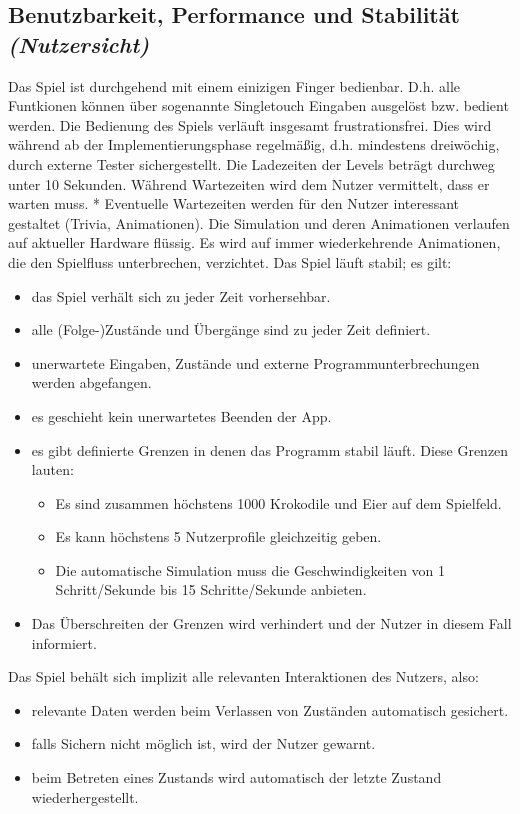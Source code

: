 \subsection{Benutzbarkeit, Performance und Stabilität \textit{(Nutzersicht)}}
\begin{requirements}
	 Das Spiel ist durchgehend mit einem einizigen Finger bedienbar. D.h. alle Funtkionen können über sogenannte Singletouch Eingaben ausgelöst bzw. bedient werden.
	 Die Bedienung des Spiels verläuft insgesamt frustrationsfrei. Dies wird während ab der Implementierungsphase regelmäßig, d.h. mindestens dreiwöchig, durch externe Tester sichergestellt.
	 Die Ladezeiten der Levels beträgt durchweg unter 10 Sekunden.
	 Während Wartezeiten wird dem Nutzer vermittelt, dass er warten muss.
	 Eventuelle Wartezeiten werden für den Nutzer interessant gestaltet (Trivia, Animationen).
	 Die Simulation und deren Animationen verlaufen auf aktueller Hardware flüssig.
	 Es wird auf immer wiederkehrende Animationen, die den Spielfluss unterbrechen, verzichtet.
	 Das Spiel läuft stabil; es gilt:
		\begin{itemize}
			\item das Spiel verhält sich zu jeder Zeit vorhersehbar.
			\item alle (Folge-)Zustände und Übergänge sind zu jeder Zeit definiert.
			\item unerwartete Eingaben, Zustände und externe Programmunterbrechungen werden abgefangen.
			\item es geschieht kein unerwartetes Beenden der App.
			\item es gibt definierte Grenzen in denen das Programm stabil läuft. Diese Grenzen lauten:
				\begin{itemize}
					\item Es sind zusammen höchstens 1000 Krokodile und Eier auf dem Spielfeld.
					\item Es kann höchstens 5 Nutzerprofile gleichzeitig geben.
					\item Die automatische Simulation muss die Geschwindigkeiten von 1 Schritt/Sekunde bis 15 Schritte/Sekunde anbieten.
				\end{itemize}
			\item Das Überschreiten der Grenzen wird verhindert und der Nutzer in diesem Fall informiert.
		\end{itemize}
	 Das Spiel behält sich implizit alle relevanten Interaktionen des Nutzers, also:
		\begin{itemize}
			\item relevante Daten werden beim Verlassen von Zuständen automatisch gesichert.
			\item falls Sichern nicht möglich ist, wird der Nutzer gewarnt.
			\item beim Betreten eines Zustands wird automatisch der letzte Zustand wiederhergestellt.
		\end{itemize}
\end{requirements}

